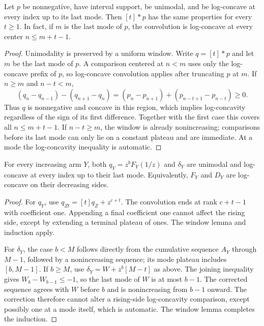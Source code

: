 \begin{lemma}
Let $p$ be nonnegative, have interval support, be unimodal, and be
log-concave at every index up to its last mode. Then $[t]*p$ has
the same properties for every $t\ge1$. In fact, if $m$ is the last
mode of $p$, the convolution is log-concave at every center
$n\le m+t-1$.
\end{lemma}
\begin{proof}
Unimodality is preserved by a uniform window. Write $q=[t]*p$ and
let $m$ be the last mode of $p$. A comparison centered at $n<m$
uses only the log-concave prefix of $p$, so log-concave convolution
applies after truncating $p$ at $m$. If $n\ge m$ and $n-t<m$,
\[
 (q_n-q_{n-1})-(q_{n+1}-q_n)
   =(p_n-p_{n+1})+(p_{n-t+1}-p_{n-t})\ge0.
\]
Thus $q$ is nonnegative and concave in this region, which implies
log-concavity regardless of the sign of its first difference.
Together with the first case this covers all $n\le m+t-1$.
If $n-t\ge m$, the window
is already nonincreasing; comparisons before its last mode can
only lie on a constant plateau and are immediate. At a mode
the log-concavity inequality is automatic.
\end{proof}

\begin{theorem}
For every increasing arm $Y$, both $q_Y=z^bF_Y(1/z)$ and
$\delta_Y$ are unimodal and log-concave at every index up to their
last mode. Equivalently, $F_Y$ and $D_Y$ are log-concave on their
decreasing sides.
\end{theorem}
\begin{proof}
For $q_Y$, use $q_{Zt}=[t]q_Z+z^{c+t}$. The convolution ends at
rank $c+t-1$ with coefficient one. Appending a final coefficient
one cannot affect the rising side, except by extending a terminal
plateau of ones. The window lemma and induction apply.

For $\delta_Y$, the case $b<M$ follows directly from the cumulative
sequence $A_Y$ through $M-1$, followed by a nonincreasing sequence;
its mode plateau includes $[b,M-1]$. If $b\ge M$, use
$\delta_Y=W+z^b[M-t]$ as above. The joining inequality gives
$W_b-W_{b-1}\le-1$, so the last mode of $W$ is at most $b-1$.
The corrected sequence agrees with $W$ before $b$ and is
nonincreasing from $b-1$ onward. The correction therefore cannot
alter a rising-side log-concavity comparison, except possibly one
at a mode itself, which is automatic. The window lemma completes
the induction.
\end{proof}

